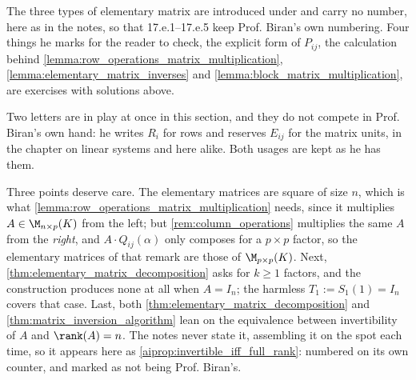 \begin{ainote}
The three types of elementary matrix are introduced under  and
carry no number, here as in the notes, so that 17.e.1--17.e.5 keep Prof. Biran's
own numbering. Four things he marks for the reader to check, the explicit form
of $P_{ij}$, the calculation behind
\cref{lemma:row_operations_matrix_multiplication},
\cref{lemma:elementary_matrix_inverses} and
\cref{lemma:block_matrix_multiplication}, are exercises with solutions above.

Two letters are in play at once in this section, and they do not compete in
Prof. Biran's own hand: he writes $R_i$ for rows and reserves $E_{ij}$ for the
matrix units, in the chapter on linear systems and here alike. Both usages are
kept as he has them.

Three points deserve care. The elementary matrices are square of size $n$, which
is what \cref{lemma:row_operations_matrix_multiplication} needs, since it
multiplies $A \in \M_{n \times p}(K)$ from the left; but
\cref{rem:column_operations} multiplies the same $A$ from the \emph{right}, and
$A \cdot Q_{ij}(\alpha)$ only composes for a $p \times p$ factor, so the
elementary matrices of that remark are those of $\M_{p \times p}(K)$. Next,
\cref{thm:elementary_matrix_decomposition} asks for $k \ge 1$ factors, and the
construction produces none at all when $A = I_n$; the harmless
$T_1 := S_1(1) = I_n$ covers that case. Last, both
\cref{thm:elementary_matrix_decomposition} and
\cref{thm:matrix_inversion_algorithm} lean on the equivalence between
invertibility of $A$ and $\rank(A) = n$. The notes never state it, assembling it
on the spot each time, so it appears here as
\cref{aiprop:invertible_iff_full_rank}: numbered on its own counter, and marked
as not being Prof. Biran's.
\end{ainote}


